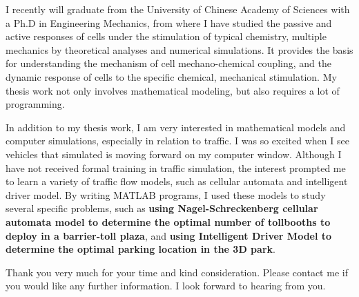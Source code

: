 \documentclass[11pt,a4paper,sans]{moderncv}        %
\begin{document}
I recently will graduate from the University of Chinese Academy of Sciences with a Ph.D in Engineering Mechanics, from where I have studied the passive and active responses of cells under the stimulation of typical chemistry, multiple mechanics by theoretical analyses and numerical simulations. It provides the basis for understanding the mechanism of cell mechano-chemical coupling, and the dynamic response of cells to the specific chemical, mechanical stimulation. My thesis work not only involves mathematical modeling, but also requires a lot of programming.

In addition to my thesis work, I am very interested in mathematical models and computer simulations, especially in relation to traffic. I was so excited when I see vehicles that simulated is moving forward on my computer window. Although I have not received formal training in traffic simulation, the interest prompted me to learn a variety of traffic flow models, such as cellular automata and intelligent driver model. By writing MATLAB programs, I used these models to study several specific problems, such as \textbf{using Nagel-Schreckenberg cellular automata model to determine the optimal number of tollbooths to deploy in a barrier-toll plaza}, and \textbf{using Intelligent Driver Model to determine the optimal parking location in the 3D park}. 


Thank you very much for your time and kind consideration. Please contact me if you would like any further information. I look forward to hearing from you.

\vspace{1em}
\makeletterclosing

\end{document}
